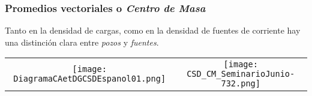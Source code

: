 \documentclass{beamer}
\begin{document}
\begin{frame}
\frametitle{Promedios vectoriales o \emph{Centro de Masa}} 
Tanto en la densidad de cargas, como en la densidad de fuentes de corriente
hay una distinción clara entre \emph{pozos} y \emph{fuentes}.
\begin{center}
  \begin{tabular}{cc}
    \texttt{[image: DiagramaCAetDGCSDEspanol01.png]}   &
    \texttt{[image: CSD\_CM\_SeminarioJunio-732.png]}
  \end{tabular}
\end{center}
  
\end{frame}
\end{document}
